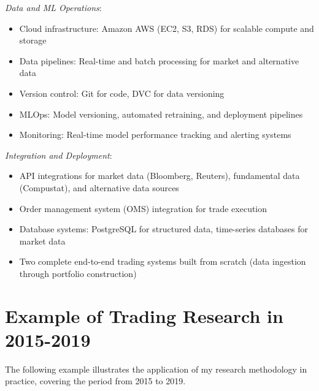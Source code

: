 \documentclass[11pt, letterpaper]{article}
\begin{document}
  \emph{Data and ML Operations}:

  \begin{itemize}
    \item Cloud infrastructure: Amazon AWS (EC2, S3, RDS) for scalable
      compute and storage

    \item Data pipelines: Real-time and batch processing for market and
      alternative data

    \item Version control: Git for code, DVC for data versioning

    \item MLOps: Model versioning, automated retraining, and deployment
      pipelines

    \item Monitoring: Real-time model performance tracking and alerting
      systems
  \end{itemize}

  \emph{Integration and Deployment}:

  \begin{itemize}
    \item API integrations for market data (Bloomberg, Reuters), fundamental
      data (Compustat), and alternative data sources

    \item Order management system (OMS) integration for trade execution

    \item Database systems: PostgreSQL for structured data, time-series databases
      for market data

    \item Two complete end-to-end trading systems built from scratch (data
      ingestion through portfolio construction)
  \end{itemize}

  \section{Example of Trading Research in 2015-2019}
  \label{example-of-trading-research-in-2015-2019}

  The following example illustrates the application of my research
  methodology in practice, covering the period from 2015 to 2019.

\end{document}

